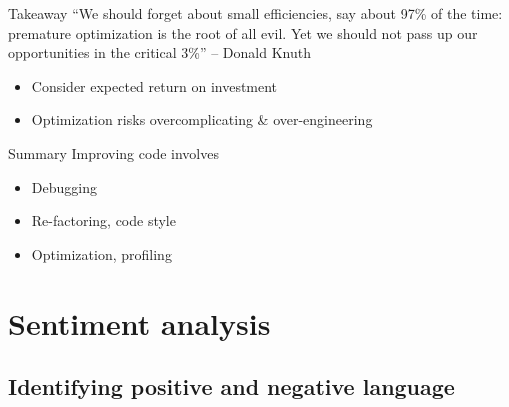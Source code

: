 \documentclass[aspectratio=169,usenames,dvipsnames]{beamer}
\begin{document}
\begin{frame}{Takeaway}
    ``We should forget about small efficiencies, say about 97\% of the time:
    premature optimization is the root of all evil.
	\pause
	Yet we should not pass up our opportunities in the critical 3\%''
    -- Donald Knuth

    \vspace{1em}
    \begin{itemize}
        \item Consider expected return on investment
        \item Optimization risks overcomplicating \& over-engineering
    \end{itemize}
\end{frame}

\begin{frame}{Summary}
    Improving code involves
    \begin{itemize}
        \item Debugging
        \item Re-factoring, code style
        \item Optimization, profiling
    \end{itemize}
\end{frame}





\section{Sentiment analysis}
\subsection{Identifying positive and negative language}
\frame{\tableofcontents[currentsection]}
\end{document}
